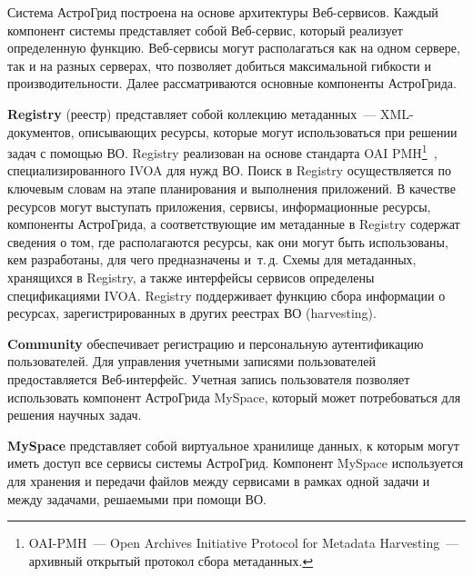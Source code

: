 \begin{multicols}{2}
     Система АстроГрид построена на основе архитектуры Веб-сервисов. Каждый
компонент системы представляет собой Веб-сервис, который реализует определенную
функцию. Веб-сервисы могут располагаться как на одном сервере, так и на разных
серверах, что позволяет добиться максимальной гибкости и производительности. Далее
рас\-смат\-ри\-ва\-ются основные компоненты Астро\-Грида.

\textbf{Registry} (реестр) представляет собой коллекцию метаданных~---
XML-документов, описывающих ресурсы, которые могут использоваться при решении
задач с помощью ВО. Registry реализован на основе стандарта OAI
PMH\footnote{OAI-PMH~--- Open Archives Initiative Protocol for Metadata
Harvesting~--- архивный открытый протокол сбора метаданных.}~\cite{OAIpmh},
специализированного IVOA для нужд ВО. Поиск в Registry осуществляется по ключевым
словам на этапе планирования и выполнения приложений. В качестве ресурсов могут
выступать приложения, сервисы, информационные ресурсы, компоненты АстроГрида, а
соответствующие им метаданные в Regis\-try содержат сведения о том, где располагаются
ресурсы, как они могут быть использованы, кем разработаны, для чего предназначены
и~т.\,д. Схемы для метаданных, хранящихся в Registry, а также интерфейсы сервисов
определены спецификациями IVOA. Regis\-try поддерживает функцию сбора информации о
ресурсах, зарегистрированных в других реестрах ВО (harvesting).

\textbf{Community} обеспечивает регистрацию и персональную
аутентификацию пользователей. Для управления учетными записями пользователей
предо\-став\-ля\-ет\-ся Веб-интерфейс. Учетная запись пользователя позволяет использовать
компонент АстроГрида MySpace, который может потребоваться для решения научных
задач.

     \textbf{MySpace} представляет собой виртуальное хранилище данных, к
которым могут иметь доступ все сервисы системы АстроГрид. Компонент My\-Space
используется для хранения и передачи файлов между сервисами в рамках одной задачи и
между задачами, решаемыми при помощи ВО.


\end{multicols}
